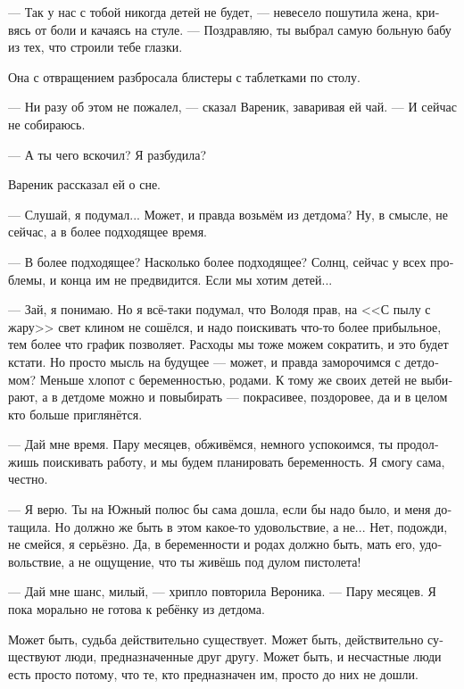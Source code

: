 \documentclass[a5paper,12pt,fleqn]{extbook}\usepackage{cooltooltips}\usepackage{polyglossia}\setdefaultlanguage[babelshorthands=true]{russian}\setotherlanguage{english}\defaultfontfeatures{Ligatures=TeX,Mapping=tex-text} \usepackage{xcolor}\definecolor{lightgray}{HTML}{bbbbbb}\color{lightgray}\newcommand{\ml}[3]{\textenglish{\textcolor{black}{#3}}}
\newcommand{\asterism}{\vspace{1em}{\centering\Large\bfseries$\ast~\ast~\ast$\par}\vspace{1em}}
\begin{document}
--- Так у нас с тобой никогда детей не будет, --- невесело пошутила жена, кривясь от боли и качаясь на стуле.
--- Поздравляю, ты выбрал самую больную бабу из тех, что строили тебе глазки.

Она с отвращением разбросала блистеры с таблетками по столу.

--- Ни разу об этом не пожалел, --- сказал Вареник, заваривая ей чай.
--- И сейчас не собираюсь.

--- А ты чего вскочил?
Я разбудила?

Вареник рассказал ей о сне.

--- Слушай, я подумал...
Может, и правда возьмём из детдома?
Ну, в смысле, не сейчас, а в более подходящее время.

--- В более подходящее?
Насколько более подходящее?
Солнц, сейчас у всех проблемы, и конца им не предвидится.
Если мы хотим детей...

--- Зай, я понимаю.
Но я всё-таки подумал, что Володя прав, на <<С пылу с жару>> свет клином не сошёлся, и надо поискивать что-то более прибыльное, тем более что график позволяет.
Расходы мы тоже можем сократить, и это будет кстати.
Но просто мысль на будущее --- может, и правда заморочимся с детдомом?
Меньше хлопот с беременностью, родами.
К тому же своих детей не выбирают, а в детдоме можно и повыбирать --- покрасивее, поздоровее, да и в целом кто больше приглянётся.

--- Дай мне время.
Пару месяцев, обживёмся, немного успокоимся, ты продолжишь поискивать работу, и мы будем планировать беременность.
Я смогу сама, честно.

--- Я верю.
Ты на Южный полюс бы сама дошла, если бы надо было, и меня дотащила.
Но должно же быть в этом какое-то удовольствие, а не...
Нет, подожди, не смейся, я серьёзно.
Да, в беременности и родах должно быть, мать его, удовольствие, а не ощущение, что ты живёшь под дулом пистолета!

--- Дай мне шанс, милый, --- хрипло повторила Вероника.
--- Пару месяцев.
Я пока морально не готова к ребёнку из детдома.

\asterism

Может быть, судьба действительно существует.
Может быть, действительно существуют люди, предназначенные друг другу.
Может быть, и несчастные люди есть просто потому, что те, кто предназначен им, просто до них не дошли.
\end{document}
